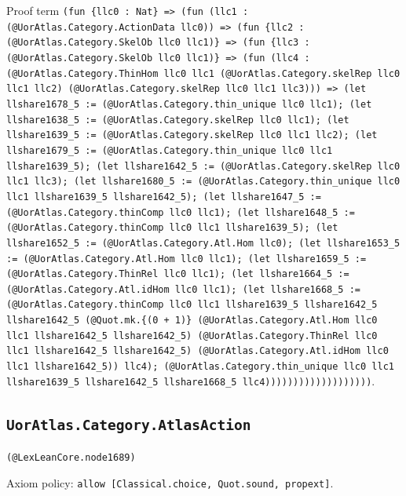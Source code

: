 \documentclass[11pt]{article}
\begin{document}
\noindent Proof term \texttt{(fun \{llc0 : Nat\} => (fun (llc1 : (@UorAtlas.Category.ActionData llc0)) => (fun \{llc2 : (@UorAtlas.Category.SkelOb llc0 llc1)\} => (fun \{llc3 : (@UorAtlas.Category.SkelOb llc0 llc1)\} => (fun (llc4 : (@UorAtlas.Category.ThinHom llc0 llc1 (@UorAtlas.Category.skelRep llc0 llc1 llc2) (@UorAtlas.Category.skelRep llc0 llc1 llc3))) => (let llshare1678\_5 := (@UorAtlas.Category.thin\_unique llc0 llc1); (let llshare1638\_5 := (@UorAtlas.Category.skelRep llc0 llc1); (let llshare1639\_5 := (@UorAtlas.Category.skelRep llc0 llc1 llc2); (let llshare1679\_5 := (@UorAtlas.Category.thin\_unique llc0 llc1 llshare1639\_5); (let llshare1642\_5 := (@UorAtlas.Category.skelRep llc0 llc1 llc3); (let llshare1680\_5 := (@UorAtlas.Category.thin\_unique llc0 llc1 llshare1639\_5 llshare1642\_5); (let llshare1647\_5 := (@UorAtlas.Category.thinComp llc0 llc1); (let llshare1648\_5 := (@UorAtlas.Category.thinComp llc0 llc1 llshare1639\_5); (let llshare1652\_5 := (@UorAtlas.Category.Atl.Hom llc0); (let llshare1653\_5 := (@UorAtlas.Category.Atl.Hom llc0 llc1); (let llshare1659\_5 := (@UorAtlas.Category.ThinRel llc0 llc1); (let llshare1664\_5 := (@UorAtlas.Category.Atl.idHom llc0 llc1); (let llshare1668\_5 := (@UorAtlas.Category.thinComp llc0 llc1 llshare1639\_5 llshare1642\_5 llshare1642\_5 (@Quot.mk.\{(0 + 1)\} (@UorAtlas.Category.Atl.Hom llc0 llc1 llshare1642\_5 llshare1642\_5) (@UorAtlas.Category.ThinRel llc0 llc1 llshare1642\_5 llshare1642\_5) (@UorAtlas.Category.Atl.idHom llc0 llc1 llshare1642\_5)) llc4); (@UorAtlas.Category.thin\_unique llc0 llc1 llshare1639\_5 llshare1642\_5 llshare1668\_5 llc4)))))))))))))))))))}.\par
\subsection*{\texttt{UorAtlas.Category.AtlasAction}}
\noindent\texttt{(@LexLeanCore.node1689)}\par
\noindent Axiom policy: \texttt{allow [Classical.choice, Quot.sound, propext]}.\par
\end{document}
